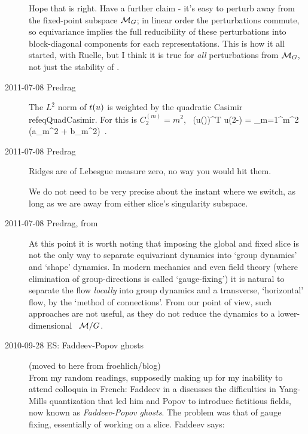 \begin{description}
Hope that is right. Have a further claim - it's easy to perturb away from
the fixed-point subspace ${\cal M}_{G}$; in linear order the perturbations
commute, so equivariance implies the full reducibility of these
perturbations into block-diagonal components for each representations.
This is how it all started, with Ruelle, but I think it is true
for \emph{all} perturbations from  ${\cal M}_{G}$, not just the stability
of \eqva.

\item[2011-07-08 Predrag]
The $L^2$ norm of $t(u)$ is weighted by
the quadratic Casimir  refeq{QuadCasimir}. For  this is
$C_2^{(m)} = m^2$,
\beq
\oint {}
     \, (\Lg u(\gSpace))^T \Lg u(2\pi-\gSpace)
= \sum_{m=1}^\infty m^2 \left(a_m^2 + b_m^2\right)
\,.


\item[2011-07-08 Predrag]
Ridges are of Lebesgue measure zero, no way you would hit them.

We do not need to be very precise about the instant
where we switch, as long as we are away from either slice's singularity
subspace.


\item[2011-07-08 Predrag, from \refref{FrCv11}]                     \toCB
At this point it is worth noting that imposing the global and fixed slice
is not the only way to separate equivariant dynamics into `group
dynamics' and `shape' dynamics. In modern mechanics and even
field theory (where elimination of group-directions is called
`gauge-fixing') it is natural to separate the flow {\em locally} into
group dynamics and a transverse, `horizontal'
flow, by the `method of
connections'. From our point of view, such
approaches are not useful, as they do not reduce the dynamics to a
lower-dimensional \reducedsp\ ${\cal M}/G$.

\item[2010-09-28 ES: Faddeev-Popov ghosts]                    \toCB
(moved to here from froehlich/blog)
\\
From my random readings, supposedly making up for my inability to attend
colloquia in French: Faddeev in a
 discusses the difficulties in Yang-Mills quantization that led
him and Popov to introduce fictitious fields, now known as
\emph{Faddeev-Popov ghosts}. The problem was that of gauge fixing,
essentially of working on a slice. Faddeev says:


\end{description}

